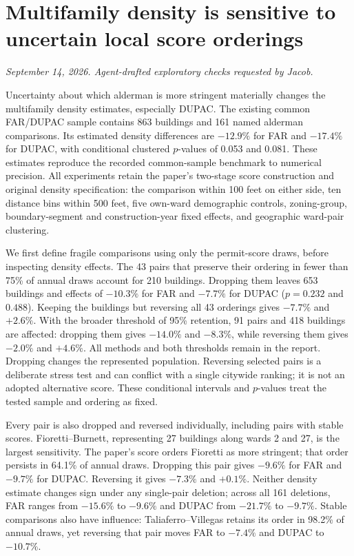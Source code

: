 \clearpage
\section*{Multifamily density is sensitive to uncertain local score orderings}
\textit{September 14, 2026. Agent-drafted exploratory checks requested by Jacob.}

Uncertainty about which alderman is more stringent materially changes the
multifamily density estimates, especially DUPAC. The existing common FAR/DUPAC
sample contains 863 buildings and 161 named alderman comparisons. Its estimated
density differences are $-12.9\%$ for FAR and $-17.4\%$ for DUPAC, with
conditional clustered $p$-values of 0.053 and 0.081. These estimates reproduce
the recorded common-sample benchmark to numerical precision. All experiments
retain the paper's two-stage score construction and original density
specification: the comparison within 100 feet on either side, ten distance
bins within 500 feet, five own-ward demographic controls, zoning-group,
boundary-segment and construction-year fixed effects, and geographic ward-pair
clustering.

We first define fragile comparisons using only the permit-score draws,
before inspecting density effects. The 43 pairs that preserve their ordering
in fewer than 75\% of annual draws account for 210 buildings. Dropping them
leaves 653 buildings and effects of $-10.3\%$ for FAR and $-7.7\%$ for DUPAC
($p=0.232$ and $0.488$). Keeping the buildings but reversing all 43 orderings
gives $-7.7\%$ and $+2.6\%$. With the broader threshold of 95\% retention,
91 pairs and 418 buildings are affected: dropping them gives $-14.0\%$ and
$-8.3\%$, while reversing them gives $-2.0\%$ and $+4.6\%$. All methods and
both thresholds remain in the report. Dropping changes the represented
population. Reversing selected pairs is a deliberate stress test and can
conflict with a single citywide ranking; it is not an adopted alternative
score. These conditional intervals and $p$-values treat the tested sample
and ordering as fixed.

Every pair is also dropped and reversed individually, including pairs with
stable scores. Fioretti--Burnett, representing 27 buildings along wards 2 and
27, is the largest sensitivity. The paper's score orders Fioretti as more
stringent; that order persists in 64.1\% of annual draws. Dropping this pair
gives $-9.6\%$ for FAR and $-9.7\%$ for DUPAC. Reversing it gives $-7.3\%$
and $+0.1\%$. Neither density estimate changes sign under any single-pair
deletion; across all 161 deletions, FAR ranges from $-15.6\%$ to $-9.6\%$
and DUPAC from $-21.7\%$ to $-9.7\%$. Stable comparisons also have influence:
Taliaferro--Villegas retains its order in 98.2\% of annual draws, yet
reversing that pair moves FAR to $-7.4\%$ and DUPAC to $-10.7\%$.

